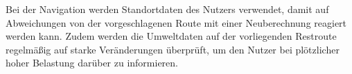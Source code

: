 Bei der Navigation werden Standortdaten des Nutzers verwendet, damit auf Abweichungen von der vorgeschlagenen Route mit einer Neuberechnung reagiert werden kann. Zudem werden die Umweltdaten auf der vorliegenden Restroute regelmäßig auf starke Veränderungen überprüft, um den Nutzer bei plötzlicher hoher Belastung darüber zu informieren.
%
%
